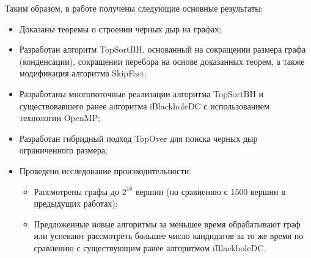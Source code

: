 \documentclass[12pt,a4paper,oneside,openany]{article}
\theoremstyle{definition}
\theoremstyle{lemma}
\theoremstyle{remark}
\begin{document}
Таким образом, в работе получены следующие основные результаты:
\begin{itemize}
    \item Доказаны теоремы о строении черных дыр на графах;
    \item Разработан алгоритм TopSortBH, основанный на сокращении размера графа (конденсации), сокращении перебора на основе доказанных теорем, а также модификация алгоритма SkipFast;
    \item Разработаны многопоточные реализации алгоритма TopSortBH и существовавшего ранее алгоритма iBlackholeDC с использованием технологии OpenMP;
    \item Разработан гибридный подход TopOver для поиска черных дыр ограниченного размера;
    \item Проведено исследование производительности:
        \begin{itemize}
            \item Рассмотрены графы до $2^{18}$ вершин (по сравнению с 1500 вершин в предыдущих работах);
            \item Предложенные новые алгоритмы за меньшее время обрабатывают граф или успевают рассмотреть большее число кандидатов за то же время по сравнению с существующим ранее алгоритмом iBlackholeDC.
        \end{itemize}
\end{itemize}

%
%
\newpage


\end{document}
